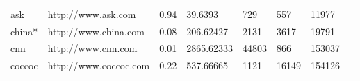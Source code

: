 \begin{table}[]
{\begin{tabular}{llllllll}
ask                                   & http://www.ask.com               & 0.94                                                                                                    & 39.6393                                                                                               & 729                                                                                & 557                                                                               & 11977                                                                                    &                                                                                             \\
china*                                & http://www.china.com             & 0.08                                                                                                    & 206.62427                                                                                             & 2131                                                                               & 3617                                                                              & 19791                                                                                    &                                                                                             \\
cnn                                   & http://www.cnn.com               & 0.01                                                                                                    & 2865.62333                                                                                            & 44803                                                                              & 866                                                                               & 153037                                                                                   &                                                                                             \\
coccoc                                & http://www.coccoc.com            & 0.22                                                                                                    & 537.66665                                                                                             & 1121                                                                               & 16149                                                                             & 154126                                                                                   &                                                                                             \\

\end{tabular}}
\end{table}
